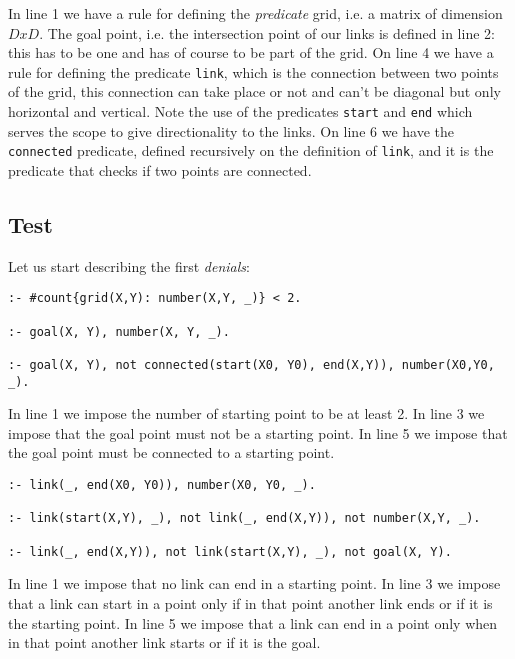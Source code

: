 In line 1 we have a rule for defining the \emph{predicate} grid, i.e. a matrix of dimension $DxD$. The goal point, i.e. the intersection point of our links is defined in line 2: this has to be one and has of course to be part of the grid.
On line 4 we have a rule for defining the predicate \texttt{link}, which is the connection between two points of the grid, this connection can take place or not and can't be diagonal but only horizontal and vertical. Note the use of the predicates \texttt{start} and \texttt{end} which serves the scope to give directionality to the links.
On line 6 we have the \texttt{connected} predicate, defined recursively on the definition of \texttt{link}, and it is the predicate that checks if two points are connected.
\subsection{Test}
Let us start describing the first \emph{denials}:

\begin{verbatim}
:- #count{grid(X,Y): number(X,Y, _)} < 2. 

:- goal(X, Y), number(X, Y, _). 

:- goal(X, Y), not connected(start(X0, Y0), end(X,Y)), number(X0,Y0, _). 
\end{verbatim}

In line 1 we impose the number of starting point to be at least 2. In line 3 we impose that the goal point must not be a starting point.
In line 5 we impose that the goal point must be connected to a starting point.


\begin{verbatim}
:- link(_, end(X0, Y0)), number(X0, Y0, _).

:- link(start(X,Y), _), not link(_, end(X,Y)), not number(X,Y, _).

:- link(_, end(X,Y)), not link(start(X,Y), _), not goal(X, Y). 
\end{verbatim}
In line 1 we impose that no link can end in a starting point. In line 3 we impose that a link can start in a point only if in that point another link ends or if it is the starting point. In line 5 we impose that a link can end in a point only when in that point another link starts or if it is the goal.


